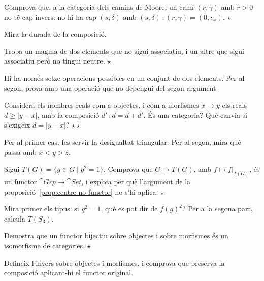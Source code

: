 \begin{exercici}
Comprova que, a la categoria dels camins de Moore, un camí $(r,\gamma)$ amb $r>0$ no té cap invers: no hi ha cap $(s,\delta)$ amb $(s,\delta)\comp(r,\gamma)=(0,c_x)$. \hfill{\normalfont$\star$}
\begin{indicacio}
Mira la durada de la composició.
\end{indicacio}
\end{exercici}

\begin{exercici}
Troba un magma de dos elements que no sigui associatiu, i un altre que sigui associatiu però no tingui neutre. \hfill{\normalfont$\star$}
\begin{indicacio}
Hi ha només setze operacions possibles en un conjunt de dos elements. Per al segon, prova amb una operació que no depengui del segon argument.
\end{indicacio}
\end{exercici}

\begin{exercici}
Considera els nombres reals com a objectes, i com a morfismes $x\to y$ els reals $d\ge|y-x|$, amb la composició $d'\comp d=d+d'$. És una categoria? Què canvia si s'exigeix $d=|y-x|$? \hfill{\normalfont$\star\star$}
\begin{indicacio}
Per al primer cas, fes servir la desigualtat triangular. Per al segon, mira què passa amb $x<y>z$.
\end{indicacio}
\end{exercici}

\begin{exercici}
Sigui $T(G)=\{g\in G\mid g^2=1\}$. Comprova que $G\mapsto T(G)$, amb $f\mapsto f|_{T(G)}$, és un functor $\cat{Grp}\to\cat{Set}$, i explica per què l'argument de la proposició~\ref{prop:centre-no-functor} no s'hi aplica. \hfill{\normalfont$\star$}
\begin{indicacio}
Mira primer els tipus: si $g^2=1$, què es pot dir de $f(g)^2$? Per a la segona part, calcula $T(S_3)$.
\end{indicacio}
\end{exercici}

\begin{exercici}
Demostra que un functor bijectiu sobre objectes i sobre morfismes és un isomorfisme de categories. \hfill{\normalfont$\star$}
\begin{indicacio}
Defineix l'invers sobre objectes i morfismes, i comprova que preserva la composició aplicant-hi el functor original.
\end{indicacio}
\end{exercici}

